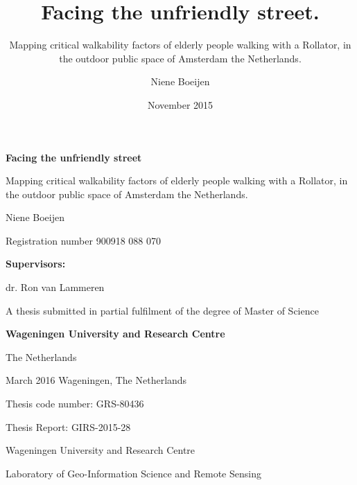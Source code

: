 \documentclass[10pt,a4paper, titlepage, onecolumn, openright, twoside, justified, parskip=full, fleqn, abstract, unicode=true, pdfencoding=auto,x11names, noindent, BCOR=1cm, DIV=calc]{scrreprt}  %
\begin{document}
 
	

	\title{Facing the unfriendly street.}
	\subtitle{Mapping critical walkability factors of elderly people walking with a Rollator, in the outdoor public space of Amsterdam the Netherlands.}
	\date{November 2015}
	\author{Niene Boeijen}

	
	
	\begin{titlepage}
		\begin{center}
			\LARGE \textbf{Facing the unfriendly street}
			\vspace*{0.5cm}
			
			\Large Mapping critical walkability factors of elderly people walking with a Rollator, in the outdoor public space of Amsterdam the Netherlands. \par
			
			\vspace*{1.5cm}
			
			Niene Boeijen
			
			Registration number 900918 088 070
			
			\vspace*{1.5cm}
			
			\textbf{Supervisors:}
			
			dr. Ron van Lammeren
			
			\vspace*{1.5cm}
			
			A thesis submitted in partial fulfilment of the degree of Master of Science
			
			\textbf{Wageningen University and Research Centre }
			
			The Netherlands
		\end{center}
		
		\vfill
		
		\begin{flushright}
			March 2016
			Wageningen, The Netherlands
		\end{flushright}
		
		\begin{flushleft}
					Thesis code number: GRS-80436
					
					Thesis Report: GIRS-2015-28			
					
					Wageningen University and Research Centre
					
					Laboratory of Geo-Information Science and Remote Sensing
		\end{flushleft}
		
	\end{titlepage}
\end{document}
